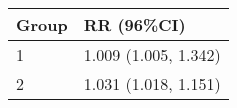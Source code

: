 \begin{tabular}{ll}
  \hline
Group & RR (96\%CI) \\ 
  \hline
   1 & 1.009 (1.005, 1.342) \\ 
     2 & 1.031 (1.018, 1.151) \\ 
   \hline
\end{tabular}

